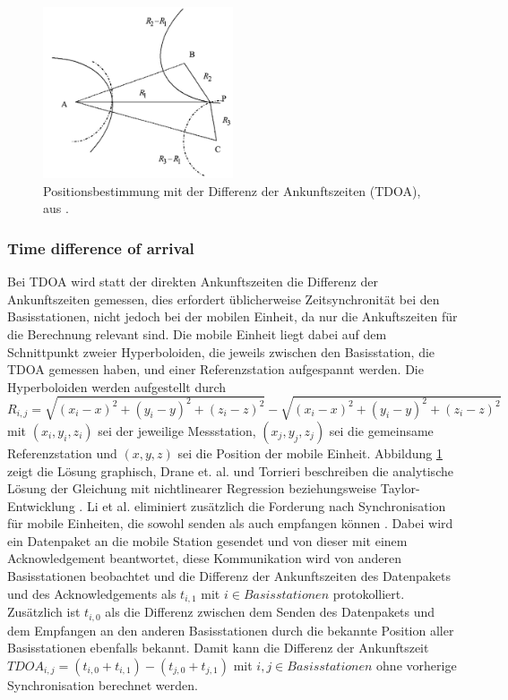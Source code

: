\begin{figure}[h]
  \centering
	\includegraphics[width=0.5\textwidth]{images/tdoa.png}
  \caption{Positionsbestimmung mit der Differenz der Ankunftszeiten (TDOA), aus \cite{liu2007survey}.}
  \label{fig:tdoa}
\end{figure}


\subsubsection{Time difference of arrival}
Bei TDOA wird statt der direkten Ankunftszeiten die Differenz der Ankunftszeiten gemessen, dies erfordert üblicherweise Zeitsynchronität bei den Basisstationen, nicht jedoch bei der mobilen Einheit, da nur die Ankuftszeiten für die Berechnung relevant sind. Die mobile Einheit liegt dabei auf dem Schnittpunkt zweier Hyperboloiden, die jeweils zwischen den Basisstation, die TDOA gemessen haben, und einer Referenzstation aufgespannt werden. 
Die Hyperboloiden werden aufgestellt durch \\
$R_{i,j} = \sqrt{(x_i - x)^2 + (y_i - y)^2 + (z_i - z)^2} - \sqrt{(x_i - x)^2 + (y_i - y)^2 + (z_i - z)^2}$ mit $(x_i,y_i,z_i)$ sei der jeweilige Messstation, $(x_j,y_j,z_j)$ sei die gemeinsame Referenzstation und $(x,y,z)$ sei die Position der mobile Einheit. %
Abbildung \ref{fig:tdoa} zeigt die Lösung graphisch, Drane et. al. und Torrieri beschreiben die analytische Lösung der Gleichung mit nichtlinearer Regression \cite{drane1998positioning} beziehungsweise Taylor-Entwicklung \cite{torrieri1984statistical}. 
Li et al. eliminiert zusätzlich die Forderung nach Synchronisation für mobile Einheiten, die sowohl senden als auch empfangen können \cite{li2000comparison}. 
Dabei wird ein Datenpaket an die mobile Station gesendet und von dieser mit einem Acknowledgement beantwortet, diese Kommunikation wird von anderen Basisstationen beobachtet und die Differenz der Ankunftszeiten des Datenpakets und des Acknowledgements als $t_{i,1}$ mit $i \in Basisstationen$ protokolliert. Zusätzlich ist $t_{i,0}$ als die Differenz zwischen dem Senden des Datenpakets und dem Empfangen an den anderen Basisstationen durch die bekannte Position aller Basisstationen ebenfalls bekannt. Damit kann die Differenz der Ankunftszeit $TDOA_{i,j} = (t_{i,0} + t_{i,1}) - (t_{j,0} + t_{j,1})$ mit $i,j \in Basisstationen$ ohne vorherige Synchronisation berechnet werden. \\


